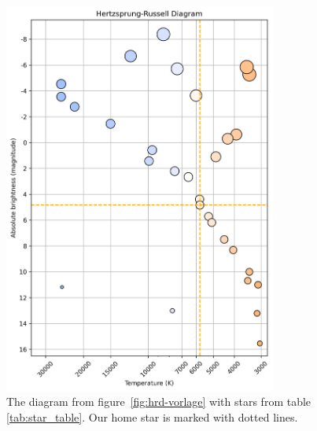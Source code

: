 \documentclass[a4paper]{article}
\begin{document}
    \begin{figure}[htbp]
        \centering
        \includegraphics[width=0.8\textwidth]{hrd_with_stars.png}
        \caption{The diagram from figure\ \ref{fig:hrd-vorlage} with stars from table \ref{tab:star_table}.
        	Our home star is marked with dotted lines.}
        \label{fig:hrd-voll}
    \end{figure}
\end{document}
